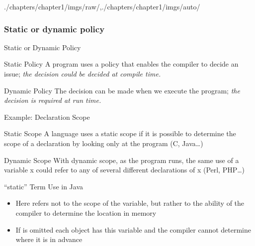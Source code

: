 \begin{graphicspathcontext}{{./chapters/chapter1/imgs/raw/},{./chapters/chapter1/imgs/auto/}}
\begin{bibunit}[apalike]
\subsubsection{Static or dynamic policy}
\begin{frame}{Static or Dynamic Policy}
	\vspace{1cm}
	\begin{definitionblock}{Static Policy}
	A program uses a policy that enables the compiler to decide an issue; \emph{the decision could be decided at compile time.}
	\end{definitionblock}
	\vspace{.5cm}
	\begin{definitionblock}{Dynamic Policy}
	The decision can be made when we execute the program; \emph{the decision is required at run time.}
	\end{definitionblock}
\end{frame}

\begin{frame}{Example: Declaration Scope}
	\begin{definitionblock}{Static Scope}
		A language uses a static scope if it is possible to determine the scope of a declaration by looking only at the program (C, Java\dots)
	\end{definitionblock}
	\vspace{1cm}
	\begin{definitionblock}{Dynamic Scope}
		With dynamic scope, as the program runs, the same use of a variable x could refer to any of several different declarations of x (Perl, PHP\dots)
	\end{definitionblock}
\end{frame}

\begin{frame}[background=6]{{``static'' Term Use} in Java}
	\begin{center}
	\end{center}
	\vfill
	\begin{itemize}
	\item Here  refers not to the scope of the variable, but rather to the ability of the compiler to determine the location in memory
	\vfill
	\item If  is omitted each object has this variable and the compiler cannot determine where it is in advance
	\end{itemize}
\end{frame}


\end{bibunit}
\end{graphicspathcontext}
